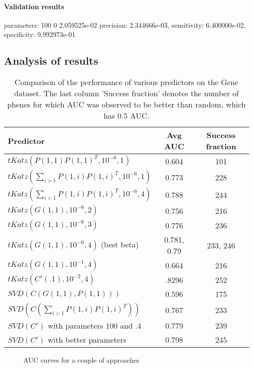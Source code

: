 \documentclass{report}
\begin{document}
\paragraph*{Validation results}
parameters: 100 0 2.059525e-02  precision: 2.344666e-03, sensitivity: 6.400000e-02, specificity: 9.992973e-01



\subsection{Analysis of results}
\begin{table*}[h]
\centering
\begin{tabular}{| p{7 cm} | c | c |} \hline
Predictor & Avg AUC & Success fraction\\ \hline\hline
$tKatz(P(1,1)P(1,1)^T, 10^{-6}, 1)$ & 0.604 & 101 \\ \hline\hline
$tKatz(\sum_{i>1} P(1,i)P(1,i)^T, 10^{-6}, 1)$ & 0.773 & 228 \\ \hline
$tKatz(\sum_{i>1} P(1,i)P(1,i)^T, 10^{-6}, 4)$ & 0.788 & 244 \\ \hline\hline
$tKatz(G(1,1), 10^{-6}, 2)$& 0.756 & 216 \\ \hline
$tKatz(G(1,1), 10^{-6}, 3)$& 0.776 & 236 \\ \hline
$tKatz(G(1,1), 10^{-6}, 4)$ (best beta)& 0.781, 0.79 & 233, 246 \\ \hline
$tKatz(G(1,1), 10^{-1}, 4)$& 0.664 & 216 \\ \hline\hline
$tKatz(C'(.1), 10^{-2}, 4)$& .8296& 252\\\hline\hline
$SVD(C(G(1,1), P(1,1)))$ & 0.596 & 175 \\ \hline
$SVD(C(\sum_{i>1} P(1,i)P(1,i)^T))$ & 0.767 & 233\\ \hline
$SVD(C')$ with parameters 100 and .4 & 0.779 & 239 \\ \hline
$SVD(C')$ with better parameters& 0.798 & 245 \\ \hline
\end{tabular}
\caption{Comparison of the performance of various predictors on the Gene dataset. The last column 'Success fraction' denotes the number of phenes for which AUC was observed to be better than random, which has 0.5 AUC.}
\label{tab:results}
\end{table*}


\begin{figure}[h!]

\label{fig:AUCPreliminary}
\caption{AUC curves for a couple of approaches}
\end{figure}
\end{document}
